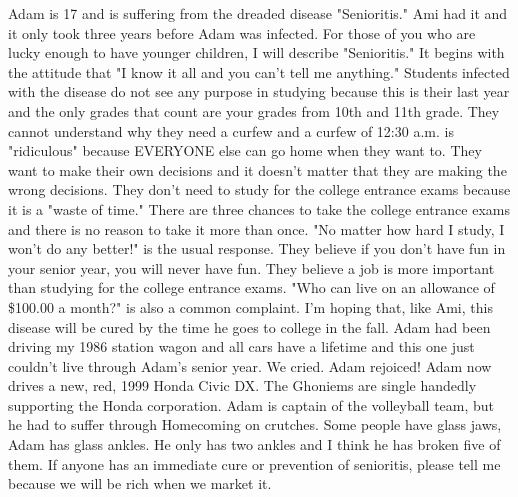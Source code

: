Adam is 17 and is suffering from the dreaded disease "Senioritis."  Ami had it and it only took three years before Adam was infected.  For those
of you who are lucky enough to have younger children, I will describe "Senioritis."  It begins with the attitude that "I know it all and you
can't tell me anything."  Students infected with the disease do not see any purpose in studying because this is their last year and the only
grades that count are your grades from 10th and 11th grade.  They cannot understand why they need a curfew and a curfew of 12:30 a.m. is
"ridiculous" because EVERYONE else can go home when they want to.  They want to make their own decisions and it doesn't matter that they are
making the wrong decisions. They don't need to study for the college entrance exams because it is a "waste of time."   There are three chances
to take the college entrance exams and there is no reason to take it more than once.  "No matter how hard I study, I won't do any better!"  is
the usual response.  They believe if you don't have fun in your senior year, you will never have fun.  They believe a job is more important than
studying for the college entrance exams.  "Who can live on an allowance of \$100.00 a month?" is also a common complaint.   I'm hoping that,
like Ami, this disease will be cured by the time he goes to college in the fall.   Adam had been driving my 1986 station wagon and all cars have
a lifetime and this one just couldn't live through Adam's senior year.  We cried.   Adam rejoiced!  Adam now drives a new, red, 1999 Honda Civic
DX.  The Ghoniems are single handedly supporting the Honda corporation.   Adam is captain of the volleyball team, but he had to suffer through
Homecoming on crutches.  Some people have glass jaws, Adam has glass ankles.  He only has two ankles and I think he has broken five of them. If
anyone has an immediate cure or prevention of senioritis, please tell me because we will be rich when we market it.

